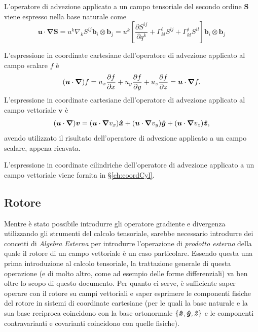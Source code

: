  L'operatore di advezione applicato a un campo tensoriale del secondo ordine $\bm{S}$ viene espresso nella base naturale come
 \begin{equation}
  \bm{u} \cdot \bm{\nabla}\bm{S}  =  u^k \nabla_k S^{ij}   \bm{b}_i \otimes \bm{b}_j
    =  u^k \left[  \dfrac{\partial S^{ij}}{\partial q^k} + \Gamma_{kl}^i S^{lj} + \Gamma_{kl}^j S^{il} \right] \bm{b}_i \otimes \bm{b}_j 
 \end{equation}
%
\begin{example}
 L'espressione in coordinate cartesiane dell'operatore di advezione applicato al campo scalare $f$ è
 \begin{equation}
  (\bm{u} \cdot \bm{\nabla}) f = u_x \dfrac{\partial f}{\partial x} + u_y \dfrac{\partial f}{\partial y} + u_z \dfrac{\partial f}{\partial z} = \bm{u} \cdot \bm{\nabla}f .
 \end{equation}
  L'espressione in coordinate cartesiane dell'operatore di advezione applicato al campo vettoriale $\bm{v}$ è
 \begin{equation}
  (\bm{u} \cdot \bm{\nabla}) \bm{v} = (\bm{u} \cdot \bm{\nabla} v_x) \bm{\hat{x}} + (\bm{u} \cdot \bm{\nabla}v_y) \bm{\hat{y}} + (\bm{u} \cdot \bm{\nabla}v_z) \bm{\hat{z}} ,
 \end{equation}
 avendo utilizzato il risultato dell'operatore di advezione applicato a un campo scalare, appena ricavata.
\end{example}
\begin{example}
 L'espressione in coordinate cilindriche dell'operatore di advezione applicato a un campo vettoriale viene fornita in \S\ref{ch:coordCyl}.
\end{example}

\subsection{Rotore}
 Mentre è stato possibile introdurre gli operatore gradiente e divergenza utilizzando gli strumenti del calcolo tensoriale, sarebbe necessario introdurre dei concetti di \textit{Algebra Esterna} per introdurre l'operazione di \textit{prodotto esterno} della quale il rotore di un campo vettoriale è un caso particolare. Essendo questa una prima introduzione al calcolo tensoriale, la trattazione generale di questa operazione (e di molto altro, come ad esempio delle forme differenziali) va ben oltre lo scopo di questo documento.
 Per quanto ci serve, è sufficiente saper operare con il rotore su campi vettoriali e saper esprimere le componenti fisiche del rotore in sistemi di coordinate cartesiane (per le quali la base naturale e la sua base reciproca coincidono con la base ortonormale $\{\bm{\hat{x}},\bm{\hat{y}},\bm{\hat{z}}\}$ e le componenti contravarianti e covarianti coincidono con quelle fisiche).

